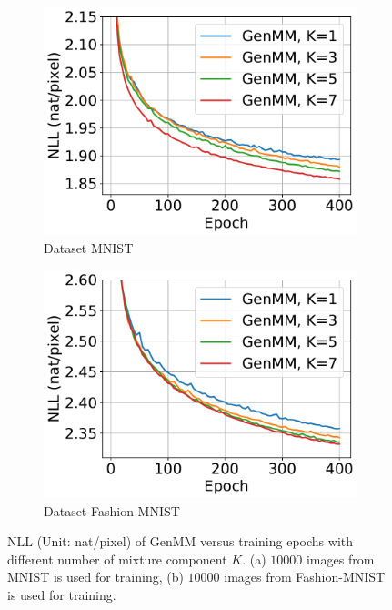 \begin{figure}[!t]
  \captionsetup[subfigure]{justification=centering}
  \centering
  \begin{subfigure}{.4\textwidth}
    \centering
    \includegraphics[width=1\linewidth]{images/supply/mnist_GenMM_nll_curves-crop.pdf}
    
    \caption{Dataset MNIST}
    \label{fig-genmm-mnist-nll-curve}
  \end{subfigure}\hspace{1cm}
  \begin{subfigure}{.4\textwidth}
    \centering
    \includegraphics[width=1\linewidth]{images/supply/fashion_GenMM_nll_curves-crop.pdf}
    
    \caption{Dataset Fashion-MNIST}
    \label{fig-genmm-fsh-nll-curve}
  \end{subfigure}
  \caption{NLL (Unit: nat/pixel) of GenMM versus training epochs with different number of mixture component $K$. (a) $10000$ images from MNIST is used for training, (b) $10000$ images from Fashion-MNIST is used for training.}
  \label{fig:genmm-nll}
\end{figure}

